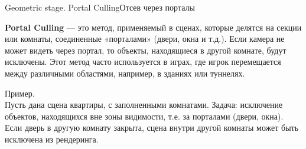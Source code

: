 \documentclass{beamer}
\begin{document}
	\begin{frame}{Geometric stage. Portal Culling}{Отсев через порталы}
		
		\textbf{Portal Culling} --- это метод, применяемый в сценах, которые делятся на секции или комнаты, соединенные «порталами» (двери, окна и т.д.). Если камера не может видеть через портал, то объекты, находящиеся в другой комнате, будут исключены. Этот метод часто используется в играх, где игрок перемещается между различными областями, например, в зданиях или туннелях.
		
		Пример. \\ 
		Пусть дана сцена квартиры, с заполненными комнатами.
		Задача: исключение объектов, находящихся вне зоны видимости, т.е. за порталами (двери, окна).\\
		Если дверь в другую комнату закрыта, сцена внутри другой комнаты может быть исключена из рендеринга. \\
				

	\end{frame}
\end{document}

